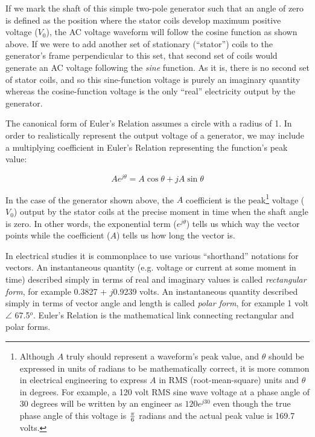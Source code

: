 If we mark the shaft of this simple two-pole generator such that an angle of zero is defined as the position where the stator coils develop maximum positive voltage ($V_0$), the AC voltage waveform will follow the cosine function as shown above.  If we were to add another set of stationary (``stator'') coils to the generator's frame perpendicular to this set, that second set of coils would generate an AC voltage following the \textit{sine} function.  As it is, there is no second set of stator coils, and so this sine-function voltage is purely an imaginary quantity whereas the cosine-function voltage is the only ``real'' electricity output by the generator.

The canonical form of Euler's Relation assumes a circle with a radius of 1.  In order to realistically represent the output voltage of a generator, we may include a multiplying coefficient in Euler's Relation representing the function's peak value:

$$Ae^{j \theta} = A \cos \theta + j A \sin \theta$$

In the case of the generator shown above, the $A$ coefficient is the peak\footnote{Although $A$ truly should represent a waveform's peak value, and $\theta$ should be expressed in units of radians to be mathematically correct, it is more common in electrical engineering to express $A$ in RMS (root-mean-square) units and $\theta$ in degrees.  For example, a 120 volt RMS sine wave voltage at a phase angle of 30 degrees will be written by an engineer as $120e^{j30}$ even though the true phase angle of this voltage is $\pi \over 6$ radians and the actual peak value is 169.7 volts.} voltage ($V_0$) output by the stator coils at the precise moment in time when the shaft angle is zero.  In other words, the exponential term ($e^{j \theta}$) tells us which way the vector points while the coefficient ($A$) tells us how long the vector is.  

\vskip 10pt

\filbreak

In electrical studies it is commonplace to use various ``shorthand'' notations for vectors.  An instantaneous quantity (e.g. voltage or current at some moment in time) described simply in terms of real and imaginary values is called \textit{rectangular form}, for example 0.3827 + $j$0.9239 volts.  An instantaneous quantity described simply in terms of vector angle and length is called \textit{polar form}, for example 1 volt $\angle$ 67.5$^{o}$.  Euler's Relation is the mathematical link connecting rectangular and polar forms.    

